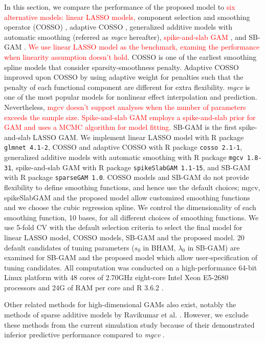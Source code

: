 \documentclass[AMA,STIX1COL,]{WileyNJD-v2}
\begin{document}
In this section, we compare the performance of the proposed model to
\textcolor{red}{six alternative models: linear LASSO models,} component
selection and smoothing operator (COSSO) \citep{Zhang2006GAM}, adaptive
COSSO \citep{Storlie2011}, generalized additive models with automatic
smoothing (referred as \textit{mgcv} hereafter)\citep{Wood2011},
\textcolor{red}{spike-and-slab GAM \cite{Scheipl2012}}, and SB-GAM
\citep{Bai2021}.
\textcolor{red}{We use linear LASSO model as the benchmark, examing the performance when linearity assumption doesn't hold}.
COSSO is one of the earliest smoothing spline models that consider
sparsity-smoothness penalty. Adaptive COSSO improved upon COSSO by using
adaptive weight for penalties such that the penalty of each functional
component are different for extra flexibility. \textit{mgcv} is one of
the most popular models for nonlinear effect interpolation and
prediction. Nevertheless,
\textcolor{red}{mgcv doesn't support analyses when the number of parameters exceeds the sample size.}
\textcolor{red}{Spike-and-slab GAM employs a spike-and-slab prior for GAM and uses a MCMC algorithm for model fitting.}
SB-GAM is the first spike-and-slab LASSO GAM. We implement linear LASSO
model with R package \texttt{glmnet 4.1-2}, COSSO and adaptive COSSO
with R package \texttt{cosso 2.1-1}, generalized additive models with
automatic smoothing with R package \texttt{mgcv 1.8-31}, spike-and-slab
GAM with R package \texttt{spikeSlabGAM 1.1-15}, and SB-GAM with R
package \texttt{sparseGAM 1.0}. COSSO models and SB-GAM do not provide
flexibility to define smoothing functions, and hence use the default
choices; mgcv, spikeSlabGAM and the proposed model allow customized
smoothing functions and we choose the cubic regression spline. We
control the dimensionality of each smoothing function, 10 bases, for all
different choices of smoothing functions. We use 5-fold CV with the
default selection criteria to select the final model for linear LASSO
model, COSSO models, SB-GAM and the proposed model. 20 default
candidates of tuning parameters (\(s_0\) in BHAM, \(\lambda_0\) in
SB-GAM) are examined for SB-GAM and the proposed model which allow
user-specification of tuning candidates. All computation was conducted
on a high-performance 64-bit Linux platform with 48 cores of 2.70GHz
eight-core Intel Xeon E5-2680 processors and 24G of RAM per core and R
3.6.2 \citep{R}.

Other related methods for high-dimensional GAMs also exist, notably the
methods of sparse additive models by Ravikumar et al.
\citep{Ravikumar2009}. However, we exclude these methods from the
current simulation study because of their demonstrated inferior
predictive performance compared to \textit{mgcv} \citep{Scheipl2013}.
\end{document}
